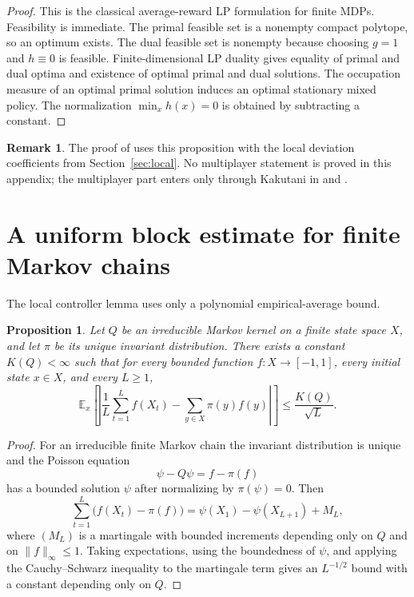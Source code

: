 \documentclass[12pt]{article}
\newtheorem{proposition}[theorem]{Proposition}
\theoremstyle{definition}
\newtheorem{remark}[theorem]{Remark}
\newcommand{\E}{\mathbb{E}}
\newcommand{\1}{\mathbf{1}}
\begin{document}
\begin{proof}
This is the classical average-reward LP formulation for finite MDPs.  Feasibility is
immediate.  The primal feasible set is a nonempty compact polytope, so an optimum
exists.  The dual feasible set is nonempty because choosing $g=1$ and $h\equiv 0$
is feasible.  Finite-dimensional LP duality gives equality of primal and dual
optima and existence of optimal primal and dual solutions.  The occupation measure
of an optimal primal solution induces an optimal stationary mixed policy.  The
normalization $\min_x h(x)=0$ is obtained by subtracting a constant.
\end{proof}

\begin{remark}
The proof of  uses this proposition with the local deviation
coefficients from Section~\ref{sec:local}.  No multiplayer statement is proved in
this appendix; the multiplayer part enters only through Kakutani in
 and .
\end{remark}

\section{A uniform block estimate for finite Markov chains}
\label{app:block-estimate}

The local controller lemma uses only a polynomial empirical-average bound.

\begin{proposition}
\label{prop:block-estimate}
Let $Q$ be an \emph{irreducible} Markov kernel on a finite state space $X$, and let
$\pi$ be its unique invariant distribution.  There exists a constant $K(Q)<\infty$
such that for every bounded function $f:X\to[-1,1]$, every initial state $x\in X$,
and every $L\ge 1$,
\[
\E_x\left[\left|\frac1L\sum_{t=1}^L f(X_t)-\sum_{y\in X}\pi(y)f(y)\right|\right]
\le \frac{K(Q)}{\sqrt L}.
\]
\end{proposition}

\begin{proof}
For an irreducible finite Markov chain the invariant distribution is unique and the
Poisson equation
\[
\psi-Q\psi = f-\pi(f)
\]
has a bounded solution $\psi$ after normalizing by $\pi(\psi)=0$.  Then
\[
\sum_{t=1}^L \bigl(f(X_t)-\pi(f)\bigr)
=
\psi(X_1)-\psi(X_{L+1}) + M_L,
\]
where $(M_L)$ is a martingale with bounded increments depending only on $Q$ and on
$\|f\|_\infty\le 1$.  Taking expectations, using the boundedness of $\psi$, and
applying the Cauchy--Schwarz inequality to the martingale term gives an
$L^{-1/2}$ bound with a constant depending only on $Q$.
\end{proof}
\end{document}
